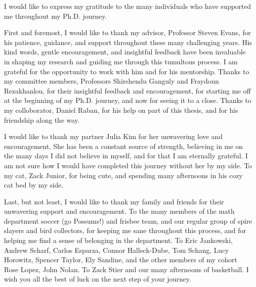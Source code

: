 \documentclass{ucbthesis}
\begin{document}
\begin{frontmatter}



\setpnumwidth{2em}
{\sloppy\tableofcontents}
\clearpage
\listoffigures

\begin{acknowledgements}

   I would like to express my gratitude to the many individuals who have supported
me throughout my Ph.D. journey.

First and foremost, I would like to thank my advisor, Professor Steven Evans, for his patience, guidance, and support throughout 
these many challenging years. His kind words, gentle encouragement, and insightful feedback
have been invaluable in shaping my research and guiding me through this tumultous process. 
I am grateful for the opportunity to work with him and for his mentorship. Thanks to my committee members, 
Professors Shirshendu Ganguly and Fraydoun Rezakhanlou, for their insightful feedback and encouragement,
for starting me off at the beginning of my Ph.D. journey, and now for seeing it to a close. Thanks to
my colloborator, Daniel Raban, for his help on part of this thesis, and for his friendship along the way.

I would like to thank my partner Julia Kim for her unwavering love and encouragement. She has been a constant source of strength, believing in me
on the many days I did not believe in myself, and for that I am eternally grateful. I am not sure
how I would have completed this journey without her by my side. To my cat, Zack Junior, for being cute, and spending many
afternoons in his cozy cat bed by my side.

Last, but not least, I would like to thank my family and friends for their unwavering support and encouragement. 
To the many members of the math department soccer (go Possums!) and frisbee team, and our regular group 
of spire slayers and bird collectors, for keeping me sane throughout this process, and for helping me find 
a sense of belonging in the department. To Eric Jankowski, Andrew Scharf, Carlos Esparza, Connor Halleck-Dube,  
Tom Schang, Lucy Horowitz, Spencer Taylor, Ely Sandine, and the other members of my cohort 
Rose Lopez, John Nolan. To Zack Stier and our many afternoons of basketball. I wish you all the best of luck on the 
next step of your journey.

\end{acknowledgements}

\end{frontmatter}
\end{document}

